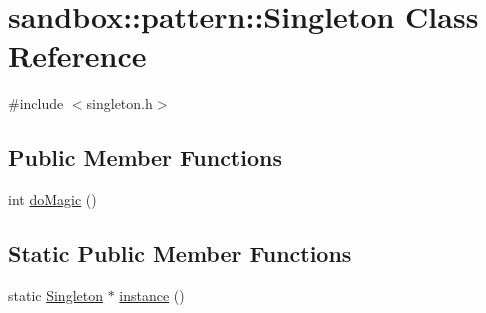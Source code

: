 \hypertarget{classsandbox_1_1pattern_1_1_singleton}{\section{sandbox\-:\-:pattern\-:\-:Singleton Class Reference}
\label{classsandbox_1_1pattern_1_1_singleton}
}


{\ttfamily \#include $<$singleton.\-h$>$}

\subsection*{Public Member Functions}
\begin{DoxyCompactItemize}
\item 
int \hyperlink{classsandbox_1_1pattern_1_1_singleton_a53a3e1a432174dabaafbff5926dd6da4}{do\-Magic} ()
\end{DoxyCompactItemize}
\subsection*{Static Public Member Functions}
\begin{DoxyCompactItemize}
\item 
static \hyperlink{classsandbox_1_1pattern_1_1_singleton}{Singleton} $\ast$ \hyperlink{classsandbox_1_1pattern_1_1_singleton_a4acfa300e795960b5922d300057406e0}{instance} ()
\end{DoxyCompactItemize}


